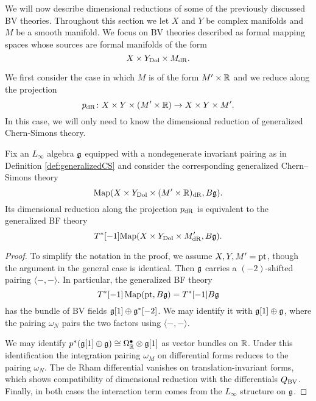 \documentclass[10pt, oneside]{article}
\newcommand{\Hod}{\mathrm{Hod}}
\begin{document}
We will now describe dimensional reductions of some of the previously discussed BV theories.
Throughout this section we let $X$ and $Y$ be complex manifolds and $M$ be a smooth manifold. 
We focus on BV theories described as formal mapping spaces whose sources are formal manifolds of the form 
\begin{equation}\label{eqn: generalized}
X \times Y_{\rm Dol} \times M_{\rm dR} .
\end{equation}

We first consider the case in which $M$ is of the form $M' \times \mathbb R$ and we reduce along the projection
\[p_{\rm dR} \colon X \times Y \times (M' \times \mathbb R) \to X \times Y \times M' .\]
In this case, we will only need to know the dimensional reduction of generalized Chern-Simons theory.

\begin{prop} \label{CS_to_BF_diml_red_prop}
Fix an $L_\infty$ algebra $\mathfrak g$ equipped with a nondegenerate invariant pairing as in Definition \ref{def:generalizedCS} and consider the corresponding generalized Chern--Simons theory
\[\operatorname{Map}(X\times Y_{\mathrm{Dol}}\times (M'\times \mathbb R)_{\mathrm{dR}}, B\mathfrak g).\]
Its dimensional reduction along the projection $p_{\rm dR}$ is equivalent to the generalized BF theory
\[
T^*[-1] {\rm Map}(X\times Y_{\mathrm{Dol}}\times M'_{\mathrm{dR}}, B\mathfrak g) .
\]
\end{prop}

\begin{proof}
To simplify the notation in the proof, we assume $X,Y,M'=\operatorname{pt}$, though the argument in the general case is identical. Then $\mathfrak g$ carries a $(-2)$-shifted pairing $\langle-,-\rangle$. In particular, the generalized BF theory
\[T^*[-1] \operatorname{Map}(\operatorname{pt}, B \mathfrak g) = T^*[-1] B \mathfrak g\]
has the bundle of BV fields $\mathfrak g[1] \oplus \mathfrak g^*[-2]$. We may identify it with $\mathfrak g[1]\oplus \mathfrak g$, where the pairing $\omega_N$ pairs the two factors using $\langle-,-\rangle$.

We may identify $p^*(\mathfrak g[1]\oplus \mathfrak g)\cong \Omega^\bullet_{\mathbb R}\otimes \mathfrak g[1]$ as vector bundles on $\mathbb R$. 
Under this identification the integration pairing $\omega_M$ on differential forms reduces to the pairing $\omega_N$. The de Rham differential vanishes on translation-invariant forms, which shows compatibility of dimensional reduction with the differentials $Q_{\mathrm{BV}}$. Finally, in both cases the interaction term comes from the $L_\infty$ structure on $\mathfrak g$.
\end{proof}

\end{document}
